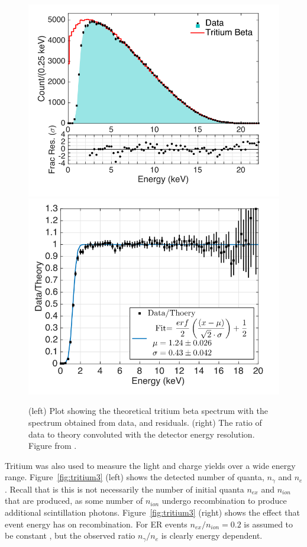 \begin{figure}[htbp]
\begin{center}
\includegraphics[width=\halffig]{figures/lux/lux_tritium1a.png}
\includegraphics[width=\halffig]{figures/lux/lux_tritium1b.png}
\caption{ (left) Plot showing the theoretical tritium beta spectrum with the spectrum obtained from data, and residuals. (right) The ratio of data to theory convoluted with the detector energy resolution. Figure from \cite{LUXTritium}.}
\label{fig:tritium1}
\end{center}
\end{figure}

Tritium was also used to measure the light and charge yields over a wide energy range. Figure~\ref{fig:tritium3} (left) shows the detected number of quanta, $n_{\gamma}$ and $n_{e}$. Recall that is this is not necessarily the number of initial quanta $n_{ex}$ and $n_{ion}$ that are produced, as some number of $n_{ion}$ undergo recombination to produce additional scintillation photons.  Figure~\ref{fig:tritium3} (right) shows the effect that event energy has on recombination. For \ac{ER} events $n_{ex} / n_{ion} = 0.2$ is assumed to be constant \cite{LUX:YieldsAndRecombination}, but the observed ratio $n_{\gamma} / n_{e}$ is clearly energy dependent.

